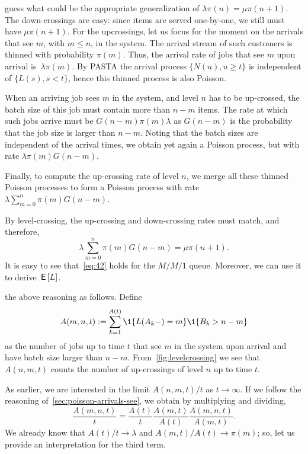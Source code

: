  guess what could be the appropriate generalization of $\lambda \pi(n) = \mu \pi(n+1)$.
The down-crossings are easy: since items are served one-by-one, we still must have $\mu \pi(n+1)$.
For the upcrossings, let us focus for the moment on the arrivals that see $m$, with $m\leq n$, in the system. The arrival stream of such customers is thinned with probability $\pi(m)$. Thus, the arrival rate of  jobs that see $m$ upon arrival is~$\lambda \pi(m)$.
By PASTA the arrival process $\{N(u), u\geq t\}$ is independent of $\{L(s), s< t\}$, hence this thinned process is also Poisson.

When an arriving job sees $m$ in the system, and level $n$ has to be up-crossed, the batch size of this job must contain more than $n-m$ items.
The rate at which such jobs arrive must be $G(n-m)\pi(m)\lambda$ as  $G(n-m)$ is the probability that the job size is larger than $n-m$.  Noting that the batch sizes are independent of the arrival times, we obtain yet again a Poisson process, but with rate $\lambda \pi(m) G(n-m)$.

Finally, to compute the up-crossing rate of level $n$, we merge
all these thinned Poisson processes to form a Poisson process with rate $\lambda \sum_{m=0}^n \pi(m) G(n-m)$.

By level-crossing, the up-crossing and down-crossing rates must match, and therefore,
\begin{equation}\label{eq:42}
\lambda \sum_{m=0}^n \pi(m) G(n-m) = \mu \pi(n+1).
\end{equation}
It is easy to see that~\cref{eq:42} holds for the $M/M/1$ queue.
Moreover, we can use it to derive $\,\mathsf{E}\left[L\right]$.

 the above reasoning as follows.
Define
\begin{equation*}
 A(m,n,t) := \sum_{k=1}^{A(t)}\1{\L(A_k-) = m}\1{B_k > n-m}
\end{equation*}
as the number of jobs up to time $t$ that see $m$ in the system upon arrival and have batch size larger than $n-m$.
From~\cref{fig:levelcrossing} we see that $A(n,m,t)$ counts the number of up-crossings of level $n$ up to time $t$.

As earlier, we are interested in the limit $A(n,m,t)/t$ as $t\to\infty$.
If we follow the reasoning of~\cref{sec:poisson-arrivals-see}, we obtain by multiplying and dividing,
\begin{equation}\label{eq:16}
 \frac{A(m,n,t)}t = \frac{A(t)}t \frac{A(m,t)}{A(t)}\frac{A(m,n,t)}{A(m,t)}.
\end{equation}
We already know that $A(t)/t\to\lambda$ and $A(m,t)/A(t)\to\pi(m)$; so, let us  provide  an interpretation for the third term.

